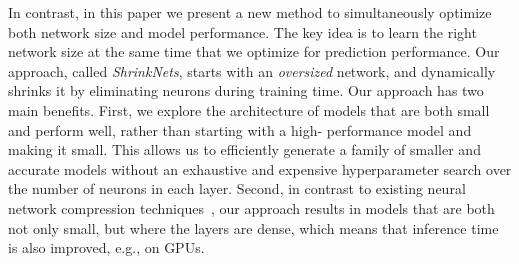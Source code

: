 In contrast, in this paper we present a new method to simultaneously optimize
both network size and model performance. The key idea is to learn the right
network size at the same time that we optimize for prediction performance. Our
approach, called {\it ShrinkNets}, starts with an {\it oversized} network, and
dynamically shrinks it by eliminating neurons during training time.  Our
approach has two main benefits.  First, we explore the architecture of models
that are both small and perform well, rather than starting with a high-
performance model and making it small.  This allows us to efficiently generate
a family of smaller and accurate models without an exhaustive and expensive
hyperparameter search over the number of neurons in each layer. Second, in
contrast to existing neural network compression techniques~\cite{Aghasi2016,han2015deepcompression}, our approach results in models that are both
not only small, but where the  layers are dense, which means that inference
time is also improved, e.g., on GPUs.



